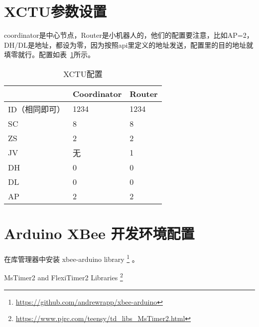 \section{XCTU参数设置}

coordinator是中心节点，Router是小机器人的，他们的配置要注意，比如AP=2，DH/DL是地址，都设为零，因为按照api里定义的地址发送，配置里的目的地址就填零就行。配置如表~\ref{tab:XCTU}所示。

\begin{table}[htbp]
    \centering
    \begin{tabular}{@{}lll@{}}
    \toprule
             & Coordinator & Router \\ \midrule
    ID（相同即可） & 1234        & 1234   \\
    SC       & 8           & 8      \\
    ZS       & 2           & 2      \\
    JV       & 无           & 1      \\
    DH       & 0           & 0      \\
    DL       & 0           & 0      \\
    AP       & 2           & 2      \\ \bottomrule
    \end{tabular}
    \caption{XCTU配置}
    \label{tab:XCTU}
\end{table}

\section{Arduino XBee 开发环境配置}

在库管理器中安装 xbee-arduino library \footnote{\url{https://github.com/andrewrapp/xbee-arduino}} 。

MsTimer2 and FlexiTimer2 Libraries \footnote{\url{https://www.pjrc.com/teensy/td_libs_MsTimer2.html}}